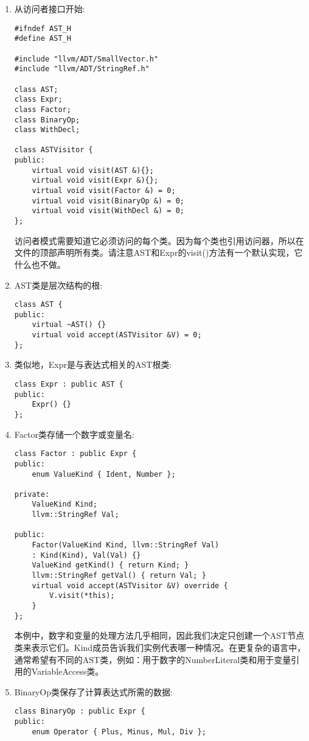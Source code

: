 \begin{enumerate}
\item 从访问者接口开始:
\begin{lstlisting}[caption={}]
#ifndef AST_H
#define AST_H

#include "llvm/ADT/SmallVector.h"
#include "llvm/ADT/StringRef.h"

class AST;
class Expr;
class Factor;
class BinaryOp;
class WithDecl;

class ASTVisitor {
public:
	virtual void visit(AST &){};
	virtual void visit(Expr &){};
	virtual void visit(Factor &) = 0;
	virtual void visit(BinaryOp &) = 0;
	virtual void visit(WithDecl &) = 0;
};
\end{lstlisting}
访问者模式需要知道它必须访问的每个类。因为每个类也引用访问器，所以在文件的顶部声明所有类。请注意AST和Expr的visit()方法有一个默认实现，它什么也不做。

\item AST类是层次结构的根:
\begin{lstlisting}[caption={}]
class AST {
public:
	virtual ~AST() {}
	virtual void accept(ASTVisitor &V) = 0;
};
\end{lstlisting}

\item 类似地，Expr是与表达式相关的AST根类:
\begin{lstlisting}[caption={}]
class Expr : public AST {
public:
	Expr() {}
};
\end{lstlisting}

\item Factor类存储一个数字或变量名:
\begin{lstlisting}[caption={}]
class Factor : public Expr {
public:
	enum ValueKind { Ident, Number };
	
private:
	ValueKind Kind;
	llvm::StringRef Val;
	
public:
	Factor(ValueKind Kind, llvm::StringRef Val)
	: Kind(Kind), Val(Val) {}
	ValueKind getKind() { return Kind; }
	llvm::StringRef getVal() { return Val; }
	virtual void accept(ASTVisitor &V) override {
		V.visit(*this);
	}
};
\end{lstlisting}
本例中，数字和变量的处理方法几乎相同，因此我们决定只创建一个AST节点类来表示它们。Kind成员告诉我们实例代表哪一种情况。在更复杂的语言中，通常希望有不同的AST类，例如：用于数字的NumberLiteral类和用于变量引用的VariableAccess类。

\item BinaryOp类保存了计算表达式所需的数据:
\begin{lstlisting}[caption={}]
class BinaryOp : public Expr {
public:
	enum Operator { Plus, Minus, Mul, Div };
	

\end{lstlisting}
\end{enumerate}
